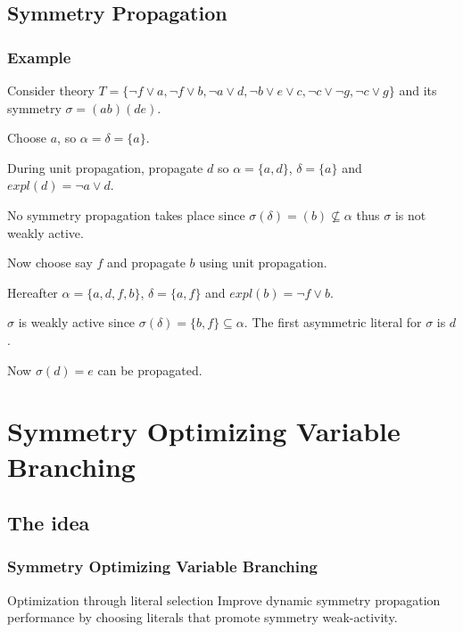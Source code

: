 \documentclass{beamer}
\begin{document}
	\subsection{Symmetry Propagation}
	\begin{frame}
		\frametitle{Example}

		\begin{block}{}
			Consider theory $T = \{\neg f \vee a, \neg f \vee b, \neg a \vee d, \neg b \vee e \vee c, \neg c \vee \neg g, \neg c \vee g\}$ and its symmetry $\sigma = (ab)(de)$.

			Choose $a$, so $\alpha = \delta = \{a\}$.

			During unit propagation, propagate $d$ so $\alpha = \{a,d\}$, $\delta = \{a\}$ and $expl(d) = \neg a \vee d$.

			No symmetry propagation takes place since $\sigma(\delta)=(b) \not \subseteq \alpha$ thus $\sigma$ is not weakly active.

			Now choose say $f$ and propagate $b$ using unit propagation.

			Hereafter $\alpha=\{a,d,f,b\}$, $\delta=\{a,f\}$ and $expl(b) = \neg f \vee b$.

			$\sigma$ is weakly active since $\sigma(\delta) = \{b,f\} \subseteq \alpha$. The first asymmetric literal for $\sigma$ is $d$.

			Now $\sigma(d) = e$ can be propagated.
		\end{block}
	\end{frame}

\section{Symmetry Optimizing Variable Branching}

	\subsection{The idea}
	\begin{frame}
		\frametitle{Symmetry Optimizing Variable Branching}

		\begin{block}{Optimization through literal selection}
			Improve dynamic symmetry propagation performance by choosing literals that promote
			symmetry weak-activity.
		\end{block}
	\end{frame}
\end{document}

